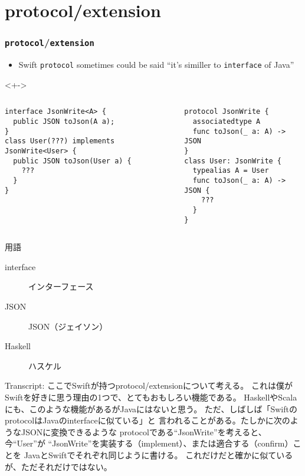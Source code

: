 \section{protocol/extension}

\begin{frame}[fragile]
  \frametitle{\texttt{protocol}/\texttt{extension}}

  \pause
  \begin{itemize}
    \item<+-> Swift \lstinline|protocol| sometimes could be said
    ``it's similler to \lstinline|interface| of Java''
  \end{itemize}

  \begin{uncoverenv}<+->
    \begin{columns}
      \begin{column}{0.55\textwidth}
\begin{lstlisting}[style=java, caption={Java interface}]
interface JsonWrite<A> {
  public JSON toJson(A a);
}
class User(???) implements JsonWrite<User> {
  public JSON toJson(User a) {
    ???
  }
}
\end{lstlisting}
    \end{column}
    \begin{column}{0.45\textwidth}
\begin{lstlisting}[style=swift, caption={Swift protocol}]
protocol JsonWrite {
  associatedtype A
  func toJson(_ a: A) -> JSON
}
class User: JsonWrite {
  typealias A = User
  func toJson(_ a: A) -> JSON {
    ???
  }
}
\end{lstlisting}
      \end{column}
    \end{columns}
  \end{uncoverenv}


  \begin{notes}
    \item 用語
    \begin{description}
      \item[interface] インターフェース
      \item[JSON] JSON（ジェイソン）
      \item[Haskell] ハスケル
    \end{description}

    \item Transcript:
    ここでSwiftが持つprotocol/extensionについて考える。
    これは僕がSwiftを好きに思う理由の1つで、とてもおもしろい機能である。
    HaskellやScalaにも、このような機能があるがJavaにはないと思う。
    ただ、しばしば「SwiftのprotocolはJavaのinterfaceに似ている」と
    言われることがある。たしかに次のようなJSONに変換できるような
    protocolである``JsonWrite''を考えると、今``User''が
    ``JsonWrite''を実装する（implement）、または適合する（confirm）ことを
    JavaとSwiftでそれぞれ同じように書ける。
    これだけだと確かに似ているが、ただそれだけではない。
  \end{notes}
\end{frame}

